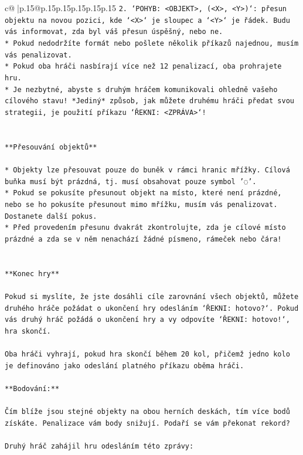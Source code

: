 \documentclass{article}
\begin{document}
{\begin{supertabular}{c@{$\;$}|p{.15\linewidth}@{}p{.15\linewidth}p{.15\linewidth}p{.15\linewidth}p{.15\linewidth}p{.15\linewidth}}
{{{\texttt{2. `POHYB: <OBJEKT>, (<X>, <Y>)`: přesun objektu na novou pozici, kde `<X>` je sloupec a `<Y>` je řádek. Budu vás informovat, zda byl váš přesun úspěšný, nebo ne.} \\
\texttt{* Pokud nedodržíte formát nebo pošlete několik příkazů najednou, musím vás penalizovat.} \\
\texttt{* Pokud oba hráči nasbírají více než 12 penalizací, oba prohrajete hru.} \\
\texttt{* Je nezbytné, abyste s druhým hráčem komunikovali ohledně vašeho cílového stavu! *Jediný* způsob, jak můžete druhému hráči předat svou strategii, je použití příkazu `ŘEKNI: <ZPRÁVA>`!} \\
\\ 
\\ 
\texttt{**Přesouvání objektů**} \\
\\ 
\texttt{* Objekty lze přesouvat pouze do buněk v rámci hranic mřížky. Cílová buňka musí být prázdná, tj. musí obsahovat pouze symbol '◌'.} \\
\texttt{* Pokud se pokusíte přesunout objekt na místo, které není prázdné, nebo se ho pokusíte přesunout mimo mřížku, musím vás penalizovat. Dostanete další pokus.} \\
\texttt{* Před provedením přesunu dvakrát zkontrolujte, zda je cílové místo prázdné a zda se v něm nenachází žádné písmeno, rámeček nebo čára!} \\
\\ 
\\ 
\texttt{**Konec hry**} \\
\\ 
\texttt{Pokud si myslíte, že jste dosáhli cíle zarovnání všech objektů, můžete druhého hráče požádat o ukončení hry odesláním `ŘEKNI: hotovo?`. Pokud vás druhý hráč požádá o ukončení hry a vy odpovíte `ŘEKNI: hotovo!`, hra skončí.} \\
\\ 
\texttt{Oba hráči vyhrají, pokud hra skončí během 20 kol, přičemž jedno kolo je definováno jako odeslání platného příkazu oběma hráči.} \\
\\ 
\texttt{**Bodování:**} \\
\\ 
\texttt{Čím blíže jsou stejné objekty na obou herních deskách, tím více bodů získáte. Penalizace vám body snižují. Podaří se vám překonat rekord?} \\
\\ 
\texttt{Druhý hráč zahájil hru odesláním této zprávy:} \\
}}}
\end{supertabular}}
\end{document}

